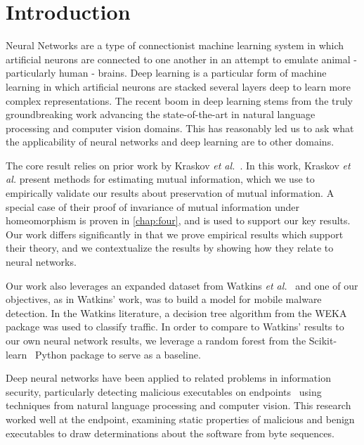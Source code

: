 \chapter{Introduction}
\label{chap:intro}


Neural Networks are a type of connectionist machine learning system in which artificial neurons are connected to one another in an attempt to emulate animal - particularly human - brains.
Deep learning is a particular form of machine learning in which artificial neurons are stacked several layers deep to learn more complex representations. 
The recent boom in deep learning stems from the truly groundbreaking work advancing the state-of-the-art in natural language processing and computer vision domains.
This has reasonably led us to ask what the applicability of neural networks and deep learning are to other domains. 

The core result relies on prior work by Kraskov \textit{et al.}~\cite{kraskov2004estimating}. 
In this work, Kraskov \textit{et al.} present methods for estimating mutual information, which we use to empirically validate our results about preservation of mutual information.
A special case of their proof of invariance of mutual information under homeomorphism is proven in \ref{chap:four}, and is used to support our key results.
Our work differs significantly in that we prove empirical results which support their theory, and we contextualize the results by showing how they relate to neural networks.

Our work also leverages an expanded dataset from Watkins \textit{et al.}~\cite{watkins2013using} and one of our objectives, as in Watkins' work, was to build a model for mobile malware detection.
In the Watkins literature, a decision tree algorithm from the WEKA package was used to classify traffic. 
In order to compare to Watkins' results to our own neural network results, we leverage a random forest from the Scikit-learn~\cite{scikit-learn} Python package to serve as a baseline.

Deep neural networks have been applied to related problems in information security, particularly detecting malicious executables on endpoints~\cite{raff2018malware} using techniques from natural language processing and computer vision.
This research worked well at the endpoint, examining static properties of malicious and benign executables to draw determinations about the software from byte sequences.

